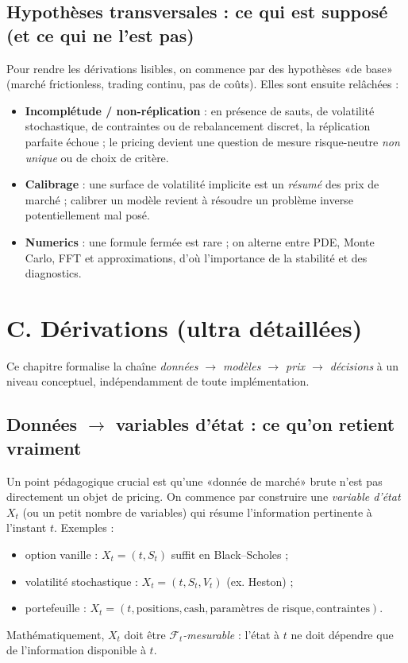 \documentclass[11pt,a4paper]{report}
\theoremstyle{definition}
\theoremstyle{plain}
\theoremstyle{remark}
\newcommand{\1}{\mathbf{1}}
\newcommand{\F}{\mathcal{F}}
\begin{document}
\subsection*{Hypothèses transversales : ce qui est supposé (et ce qui ne l'est pas)}
Pour rendre les dérivations lisibles, on commence par des hypothèses «de base» (marché frictionless, trading continu, pas de coûts). Elles sont ensuite relâchées :
\begin{itemize}[leftmargin=*]
\item \textbf{Incomplétude / non-réplication} : en présence de sauts, de volatilité stochastique, de contraintes ou de rebalancement discret, la réplication parfaite échoue ; le pricing devient une question de mesure risque-neutre \emph{non unique} ou de choix de critère.
\item \textbf{Calibrage} : une surface de volatilité implicite est un \emph{résumé} des prix de marché ; calibrer un modèle revient à résoudre un problème inverse potentiellement mal posé.
\item \textbf{Numerics} : une formule fermée est rare ; on alterne entre PDE, Monte Carlo, FFT et approximations, d'où l'importance de la stabilité et des diagnostics.
\end{itemize}

\section{C. Dérivations (ultra détaillées)}
Ce chapitre formalise la chaîne \emph{données $\to$ modèles $\to$ prix $\to$ décisions} à un niveau conceptuel, indépendamment de toute implémentation.

\subsection*{Données $\to$ variables d'état : ce qu'on retient vraiment}
Un point pédagogique crucial est qu'une «donnée de marché» brute n'est pas directement un objet de pricing.
On commence par construire une \emph{variable d'état} $X_t$ (ou un petit nombre de variables) qui résume l'information pertinente à l'instant $t$.
Exemples :
\begin{itemize}[leftmargin=*]
\item option vanille : $X_t=(t,S_t)$ suffit en Black--Scholes ;
\item volatilité stochastique : $X_t=(t,S_t,V_t)$ (ex. Heston) ;
\item portefeuille : $X_t=(t,\text{positions},\text{cash},\text{paramètres de risque},\text{contraintes})$.
\end{itemize}
Mathématiquement, $X_t$ doit être \emph{$\F_t$-mesurable} : l'état à $t$ ne doit dépendre que de l'information disponible à $t$.
\end{document}
